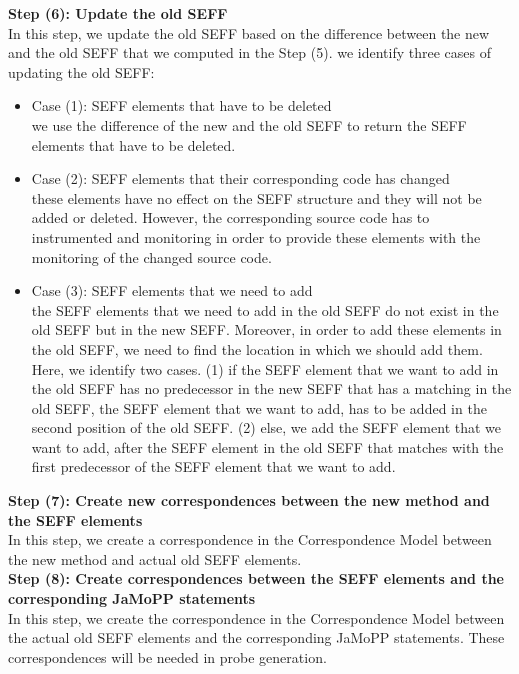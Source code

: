 \textbf{Step (6): Update the old SEFF}\\
In this step, we update the old SEFF based on the difference between the new and the old SEFF that we computed in the Step (5). we identify three cases of updating the old SEFF:
\begin{itemize}
\item Case (1): SEFF elements that have to be deleted\\
      we use the difference of the new and the old SEFF to return the SEFF elements that have to be deleted.
 \item Case (2): SEFF elements that their corresponding code has changed\\
       these elements have no effect on the SEFF structure and they will not be added or deleted. However, the corresponding source code has to instrumented and monitoring in order to provide these elements with the monitoring of the changed source code. 
\item Case (3): SEFF elements that we need to add\\
the SEFF elements that we need to add in the old SEFF do not exist in the old SEFF but in the new SEFF. Moreover, in order to add these elements in the old SEFF, we need to find the location in which we should add them. Here, we identify two cases. (1) if the SEFF element that we want to add in the old SEFF has no predecessor in the new SEFF that has a matching in the old SEFF, the SEFF element that we want to add, has to be added in the second position of the old SEFF. (2) else, we add the SEFF element that we want to add, after the SEFF element in the old SEFF that matches with the first predecessor of the SEFF element that we want to add.  \\
\end{itemize}

\textbf{Step (7): Create new correspondences between the new method and the SEFF elements}\\
In this step, we create a correspondence in the Correspondence Model between the new method and actual old SEFF elements.\\

\textbf{Step (8): Create correspondences between the SEFF elements and the corresponding JaMoPP statements}\\
In this step, we create the correspondence in the Correspondence Model between the actual old SEFF elements and the corresponding JaMoPP statements. These correspondences will be needed in probe generation.\\

